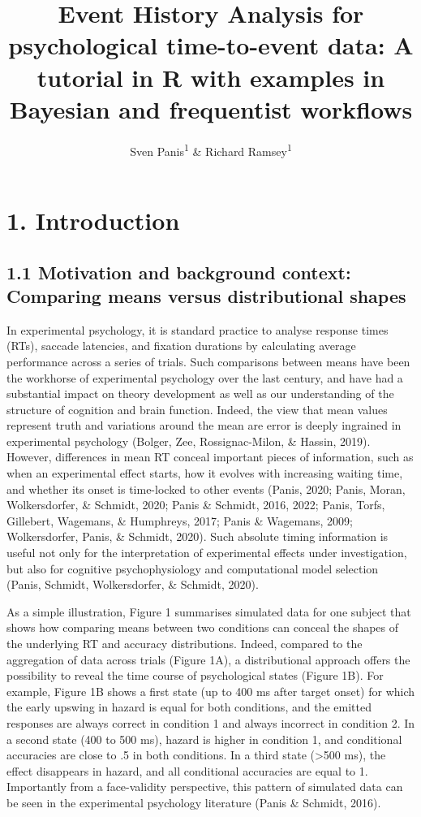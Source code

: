 \documentclass[
  man, donotrepeattitle,floatsintext]{apa6}
\title{Event History Analysis for psychological time-to-event data: A tutorial in R with examples in Bayesian and frequentist workflows}
\author{Sven Panis\textsuperscript{1} \& Richard Ramsey\textsuperscript{1}}
\date{}
\affiliation{\vspace{0.5cm}\textsuperscript{1} ETH Zürich}
\begin{document}
\maketitle

\section{1. Introduction}\label{introduction}

\subsection{1.1 Motivation and background context: Comparing means versus distributional shapes}\label{motivation-and-background-context-comparing-means-versus-distributional-shapes}

In experimental psychology, it is standard practice to analyse response times (RTs), saccade latencies, and fixation durations by calculating average performance across a series of trials. Such comparisons between means have been the workhorse of experimental psychology over the last century, and have had a substantial impact on theory development as well as our understanding of the structure of cognition and brain function. Indeed, the view that mean values represent truth and variations around the mean are error is deeply ingrained in experimental psychology (Bolger, Zee, Rossignac-Milon, \& Hassin, 2019). However, differences in mean RT conceal important pieces of information, such as when an experimental effect starts, how it evolves with increasing waiting time, and whether its onset is time-locked to other events (Panis, 2020; Panis, Moran, Wolkersdorfer, \& Schmidt, 2020; Panis \& Schmidt, 2016, 2022; Panis, Torfs, Gillebert, Wagemans, \& Humphreys, 2017; Panis \& Wagemans, 2009; Wolkersdorfer, Panis, \& Schmidt, 2020). Such absolute timing information is useful not only for the interpretation of experimental effects under investigation, but also for cognitive psychophysiology and computational model selection (Panis, Schmidt, Wolkersdorfer, \& Schmidt, 2020).

As a simple illustration, Figure 1 summarises simulated data for one subject that shows how comparing means between two conditions can conceal the shapes of the underlying RT and accuracy distributions. Indeed, compared to the aggregation of data across trials (Figure 1A), a distributional approach offers the possibility to reveal the time course of psychological states (Figure 1B). For example, Figure 1B shows a first state (up to 400 ms after target onset) for which the early upswing in hazard is equal for both conditions, and the emitted responses are always correct in condition 1 and always incorrect in condition 2. In a second state (400 to 500 ms), hazard is higher in condition 1, and conditional accuracies are close to .5 in both conditions. In a third state (\textgreater500 ms), the effect disappears in hazard, and all conditional accuracies are equal to 1. Importantly from a face-validity perspective, this pattern of simulated data can be seen in the experimental psychology literature (Panis \& Schmidt, 2016).
\end{document}
